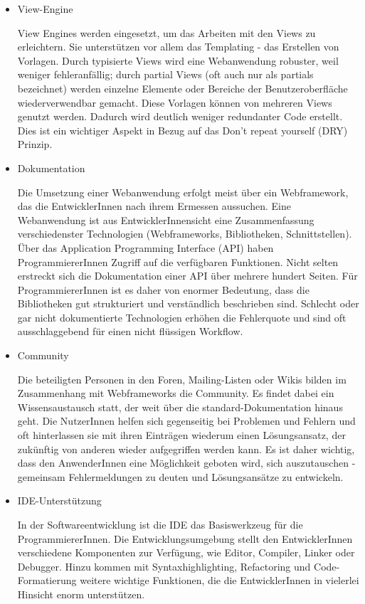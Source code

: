 \documentclass[
11pt, %
a4paper, %
BCOR25mm, %
DIV14, %
footsepline = false, %
headsepline, %
twoside, %
openright,
abstracton, %
listof=totocnumbered, %
bibliography=totocnumbered %
]{scrreprt}
\begin{document}
\begin{itemize}
  \item View-Engine

View Engines werden eingesetzt, um das Arbeiten mit den Views zu erleichtern.
Sie unterstützen vor allem das Templating - das Erstellen von Vorlagen. Durch
typisierte Views wird eine Webanwendung robuster, weil weniger fehleranfällig;
durch partial Views (oft auch nur als partials bezeichnet) werden einzelne
Elemente oder Bereiche der Benutzeroberfläche wiederverwendbar gemacht. Diese
Vorlagen können von mehreren Views genutzt werden. Dadurch wird deutlich
weniger redundanter Code erstellt. Dies ist ein wichtiger Aspekt in Bezug auf
das Don’t repeat yourself (DRY) Prinzip.

  \item Dokumentation

Die Umsetzung einer Webanwendung erfolgt meist über ein Webframework, das die
EntwicklerInnen nach ihrem Ermessen aussuchen. Eine Webanwendung ist aus
EntwicklerInnensicht eine Zusammenfassung verschiedenster Technologien
(Webframeworks, Bibliotheken, Schnittstellen). Über das Application Programming
Interface (API) haben ProgrammiererInnen Zugriff auf die verfügbaren
Funktionen. Nicht selten erstreckt sich die Dokumentation einer API über
mehrere hundert Seiten. Für ProgrammiererInnen ist es daher von enormer
Bedeutung, dass die Bibliotheken gut strukturiert und verständlich beschrieben
sind. Schlecht oder gar nicht dokumentierte Technologien erhöhen die
Fehlerquote und sind oft ausschlaggebend für einen nicht flüssigen Workflow.

  \item Community

Die beteiligten Personen in den Foren, Mailing-Listen oder Wikis bilden im
Zusammenhang mit Webframeworks die Community. Es findet dabei ein
Wissensaustausch statt, der weit über die standard-Dokumentation hinaus geht.
Die NutzerInnen helfen sich gegenseitig bei Problemen und Fehlern und oft
hinterlassen sie mit ihren Einträgen wiederum einen Lösungsansatz, der
zukünftig von anderen wieder aufgegriffen werden kann. Es ist daher wichtig,
dass den AnwenderInnen eine Möglichkeit geboten wird, sich auszutauschen -
gemeinsam Fehlermeldungen zu deuten und Lösungsansätze zu entwickeln.

  \item IDE-Unterstützung

In der Softwareentwicklung ist die IDE das Basiswerkzeug für die
ProgrammiererInnen. Die Entwicklungsumgebung stellt den EntwicklerInnen
verschiedene Komponenten zur Verfügung, wie Editor, Compiler, Linker oder
Debugger. Hinzu kommen mit Syntaxhighlighting, Refactoring und
Code-Formatierung weitere wichtige Funktionen, die die EntwicklerInnen in
vielerlei Hinsicht enorm unterstützen.


\end{itemize}
\end{document}
